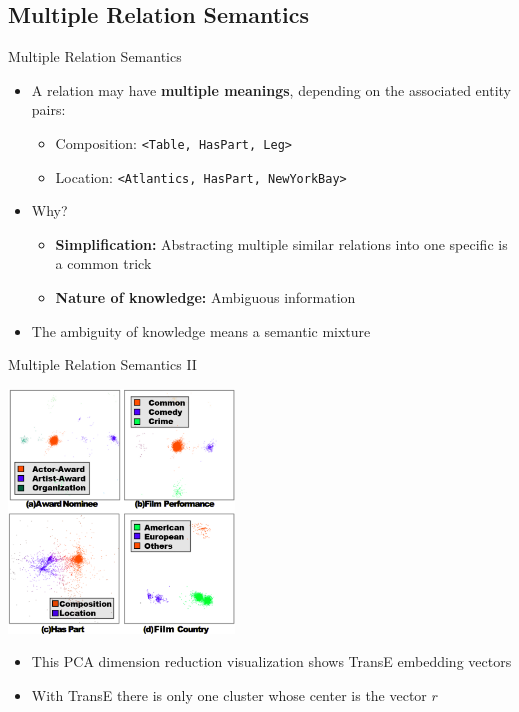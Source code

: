 \documentclass[xcolor={x11names,svgnames,dvipsnames},trans]{beamer}
\begin{document}
\subsection{Multiple Relation Semantics}
\begin{frame}{Multiple Relation Semantics}
    \begin{itemize}
        \item A relation may have \textbf{multiple meanings}, depending on the associated entity pairs:
            \begin{itemize}
                \item Composition: \texttt{<Table, HasPart, Leg>}
                \item Location: \texttt{<Atlantics, HasPart, NewYorkBay>}
            \end{itemize}
        \item Why?
            \begin{itemize}
                \item \textbf{Simplification:} Abstracting multiple similar relations into one specific is a common trick
                \item \textbf{Nature of knowledge:} Ambiguous information
            \end{itemize}
        \item The ambiguity of knowledge means a semantic mixture
    \end{itemize}
\end{frame}

\begin{frame}{Multiple Relation Semantics II}

    {\centering
    \includegraphics[width=0.45\textwidth]{images/pca.png}\par
    }

    \begin{itemize}
        \item This PCA dimension reduction visualization shows TransE embedding vectors
        \item With TransE there is only one cluster whose center is the vector $r$
    \end{itemize}
\end{frame}
\end{document}
